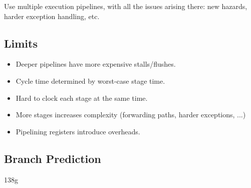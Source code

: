 \documentclass[11pt]{article}
\begin{document}
{{        Use multiple execution pipelines, with all the issues arising there: new hazards, harder exception handling, etc.
    }
    \subsection*{Limits}
    {
        \begin{itemize}
        \item Deeper pipelines have more expensive stalls/flushes.
        \item Cycle time determined by worst-case stage time.
        \item Hard to clock each stage at the same time.
        \item More stages increases complexity (forwarding paths, harder exceptions, ...)
        \item Pipelining registers introduce overheads.
        \end{itemize}
    }
    \subsection*{Branch Prediction}
    {
        138g
    }
}
\end{document}
